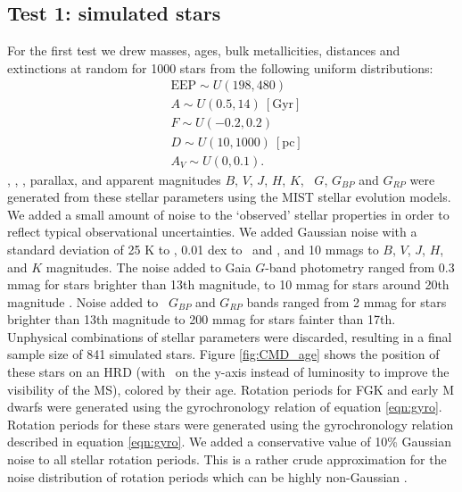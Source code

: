 \subsection{Test 1: simulated stars}
For the first test we drew masses, ages, bulk metallicities, distances and
extinctions at random for 1000 stars from the following uniform distributions:
\begin{eqnarray}
& \mathrm{EEP} \sim U(198, 480) \\
& A \sim U(0.5, 14)\mathrm{~[Gyr]} \\
& F \sim U(-0.2, 0.2) \\
& D \sim U(10, 1000)~\mathrm{[pc]} \\
& A_V \sim U(0, 0.1).
\end{eqnarray}
\teff, \logg, \fhat, parallax, and apparent magnitudes $B$, $V$, $J$, $H$, $K$,
\gaia\ $G$, $G_{BP}$ and $G_{RP}$ were generated from these
stellar parameters using the MIST stellar evolution models.
We added a small amount of noise to the `observed' stellar properties in order
to reflect typical observational uncertainties.
We added Gaussian noise with a standard deviation of 25 K to \teff, 0.01 dex
to \feh\ and \logg, and 10 mmags to $B$, $V$, $J$, $H$, and $K$ magnitudes.
The noise added to Gaia $G$-band photometry ranged from
0.3 mmag for stars brighter than 13th magnitude, to 10 mmag for stars
around 20th magnitude \citep{evans2017, brown2018}.
Noise added to \gaia\ $G_{BP}$ and $G_{RP}$ bands ranged from 2 mmag for stars
brighter than 13th magnitude to 200 mmag for stars fainter than 17th.
Unphysical combinations of stellar parameters were discarded, resulting in a
final sample size of 841 simulated stars.
Figure \ref{fig:CMD_age} shows the position of these stars on an HRD
(with \logg\ on the y-axis instead of luminosity to improve the visibility of
the MS), colored by their age.
Rotation periods for FGK and early M dwarfs were generated using the
gyrochronology relation of equation \ref{eqn:gyro}.
Rotation periods for these stars were generated using the gyrochronology
relation described in equation \ref{eqn:gyro}.
We added a conservative value of 10\% Gaussian noise to all stellar
rotation periods.
This is a rather crude approximation for the noise distribution of rotation
periods which can be highly non-Gaussian \citep[\eg][]{aigrain2015,
angus2018}.
